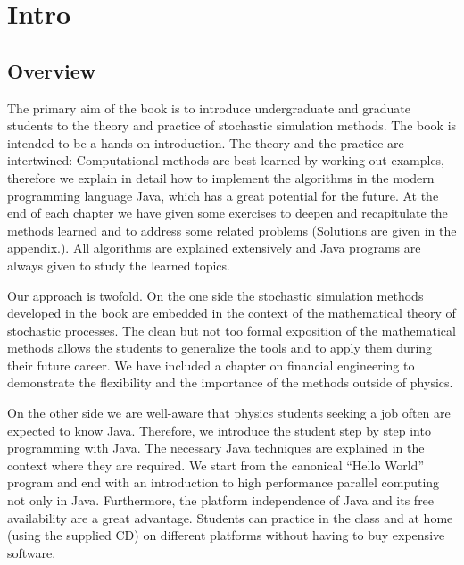 \documentclass[a4paper]{book}
\begin{document}
\chapter*{Intro}

\section*{Overview}

The primary aim of the book is to introduce undergraduate and graduate 
students to the theory and practice of stochastic simulation methods.
The book is intended to be a  hands on introduction. 
The theory and the practice are intertwined:  Computational methods are 
best learned by working out examples, therefore we explain in detail how to 
implement the algorithms in the modern programming language Java, which has 
a great 
potential for the future. At the end of each chapter we have given
some exercises to deepen and recapitulate the methods learned and to
address some related problems (Solutions are given in the appendix.).
All algorithms are explained extensively and 
Java programs are always given to study the learned topics.

Our approach is twofold. On the one side the  stochastic simulation
methods developed in the book are embedded in the context of the
mathematical theory of stochastic processes. The clean but not too formal 
exposition of the mathematical methods allows
the students to generalize the tools and to apply them during their future 
career. We have included a chapter on financial engineering to
demonstrate the flexibility and the importance of the methods outside of
physics. 

On the other side we are well-aware that physics students seeking a
job often are expected to know Java.  Therefore, we introduce the
student step by step into programming with Java. The necessary Java
techniques are explained in the context where they are required.
We start from the canonical ``Hello World'' program and end with an 
introduction to high performance parallel computing not only in Java.
Furthermore, the platform independence of Java and its free
availability are  a great advantage. Students can practice in the class 
and at home (using the supplied CD) on 
different platforms without having to buy expensive
software. 

\end{document}
